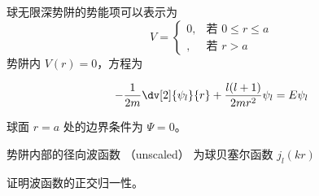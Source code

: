
\begin{issues}
\issueDraft
\end{issues}


球无限深势阱的势能项可以表示为
$$
V=
\begin{cases}
0,  & \text{若 $0\leq r\leq a$} \\
, & \text{若 $r>a$}
\end{cases}
$$
势阱内 $V(r) = 0$，方程为

\begin{equation}
-\frac{1}{2m} \dv[2]{\psi_l}{r} + \frac{l(l + 1)}{2mr^2}\psi_l = E\psi_l
\end{equation}

球面 $r = a$ 处的边界条件为 $\Psi = 0$。

势阱内部的径向波函数 （unscaled） 为球贝塞尔函数 $j_l(kr)$

证明波函数的正交归一性。

